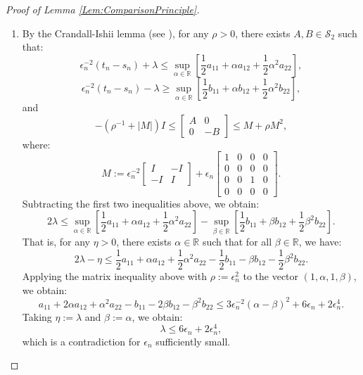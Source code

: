 \documentclass[11pt]{article}
\begin{document}
\begin{proof}[Proof of Lemma \ref{Lem:ComparisonPrinciple}]
\begin{enumerate}
\item By the Crandall-Ishii lemma (see \cite{CrandallIshiiLions1992,Touzi2013}), for any $\rho >0$, there exists $A,B\in\mathcal{S}_2$ such that:
\[\epsilon_n^{-2}(t_n-s_n)+\lambda\leq\sup\limits_{\alpha\in\mathbb{R}}\left[\frac{1}{2}a_{11}+\alpha a_{12}+\frac{1}{2}\alpha^2 a_{22}\right],\]
\[\epsilon_n^{-2}(t_n-s_n)-\lambda\geq\sup\limits_{\alpha\in\mathbb{R}}\left[\frac{1}{2}b_{11}+\alpha b_{12}+\frac{1}{2}\alpha^2 b_{22}\right],\]
and
\[-\left(\rho^{-1}+|M|\right)I\leq\left[\begin{array}{cc}A&0\\0&-B\end{array}\right]\leq M+\rho M^2,\]
where:
\[M := \epsilon_n^{-2}\left[\begin{array}{cc}
I & -I \\
-I & I
\end{array}\right]
+\epsilon_n\left[\begin{array}{cccc}
1 & 0 & 0 & 0 \\
0 & 0 & 0 & 0 \\
0 & 0 & 1 & 0 \\
0 & 0 & 0 & 0 
\end{array}\right].\]
Subtracting the first two inequalities above, we obtain:
\[2\lambda\leq \sup\limits_{\alpha\in\mathbb{R}}\left[\frac{1}{2}a_{11}+\alpha a_{12}+\frac{1}{2}\alpha^2 a_{22}\right]-\sup\limits_{\beta\in\mathbb{R}}\left[\frac{1}{2}b_{11}+\beta b_{12}+\frac{1}{2}\beta^2 b_{22}\right].\]
That is, for any $\eta >0$, there exists $\alpha\in\mathbb{R}$ such that for all $\beta\in\mathbb{R}$, we have:
\[2\lambda-\eta\leq \frac{1}{2}a_{11}+\alpha a_{12}+\frac{1}{2}\alpha^2 a_{22}-\frac{1}{2}b_{11}-\beta b_{12}-\frac{1}{2}\beta^2 b_{22}.\]
Applying the matrix inequality above with $\rho:=\epsilon_n^2$ to the vector $(1,\alpha,1,\beta)$, we obtain:
\[a_{11}+2\alpha a_{12}+\alpha^2 a_{22}-b_{11}-2\beta b_{12}-\beta^2 b_{22} \leq
3\epsilon_n^{-2}(\alpha-\beta)^2 + 6\epsilon_n+2\epsilon_n^4.\]
Taking $\eta := \lambda$ and $\beta :=\alpha$, we obtain:
\[\lambda \leq 6\epsilon_n+2\epsilon_n^4,\]
which is a contradiction for $\epsilon_n$ sufficiently small.
\end{enumerate}
\end{proof}




\end{document}
